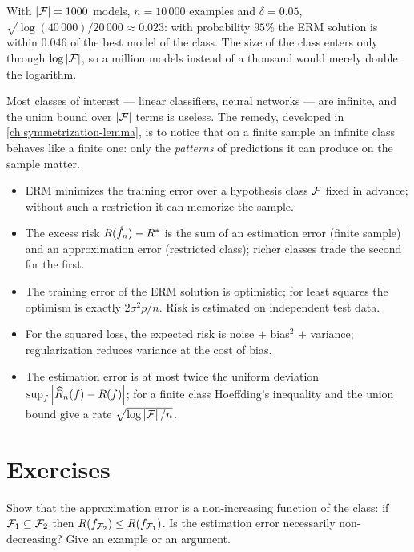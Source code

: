 \begin{notechapter}
\begin{example}
With $\left|\mathcal{F}\right| = 1000$ models, $n = 10\,000$ examples and $\delta = 0.05$,
$\sqrt{\log(40\,000)/20\,000}\approx 0.023$: with probability $95\%$ the ERM
solution is within $0.046$ of the best model of the class. The size of the
class enters only through $\log\left|\mathcal{F}\right|$, so a million models instead of a
thousand would merely double the logarithm.
\end{example}

Most classes of interest --- linear classifiers, neural networks --- are
infinite, and the union bound over $\left|\mathcal{F}\right|$ terms is useless. The remedy,
developed in \cref{ch:symmetrization-lemma}, is to notice that on a finite
sample an infinite class behaves like a finite one: only the \emph{patterns}
of predictions it can produce on the sample matter.

\begin{chaptersummary}
\begin{itemize}[nosep]
  \item ERM minimizes the training error over a hypothesis class $\mathcal{F}$ fixed in
        advance; without such a restriction it can memorize the sample.
  \item The excess risk $R(\hat f_n) - R^*$ is the sum of an estimation
        error (finite sample) and an approximation error (restricted class);
        richer classes trade the second for the first.
  \item The training error of the ERM solution is optimistic; for least
        squares the optimism is exactly $2\sigma^2p/n$. Risk is estimated on
        independent test data.
  \item For the squared loss, the expected risk is noise $+$ bias$^2$ $+$
        variance; regularization reduces variance at the cost of bias.
  \item The estimation error is at most twice the uniform deviation
        $\sup_f\left|\widehat{R}_n(f) - R(f)\right|$; for a finite class Hoeffding's
        inequality and the union bound give a rate
        $\sqrt{\log\left|\mathcal{F}\right|/n}$.
\end{itemize}
\end{chaptersummary}

\section*{Exercises}

\begin{exercise}\label{erm:exr:1}
Show that the approximation error is a non-increasing function of the class:
if $\mathcal{F}_1\subseteq\mathcal{F}_2$ then $R(f_{\mathcal{F}_2}) \leq R(f_{\mathcal{F}_1})$. Is the
estimation error necessarily non-decreasing? Give an example or an argument.
\end{exercise}


\end{notechapter}
